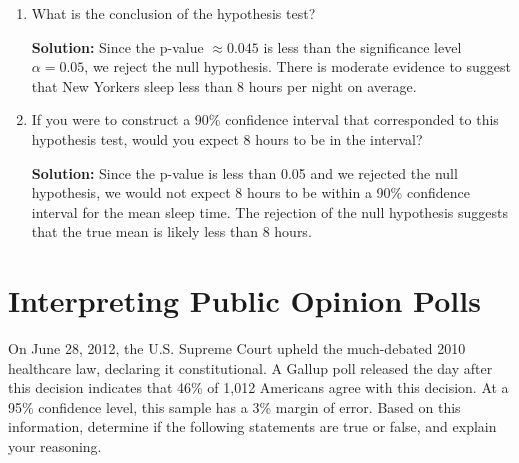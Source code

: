 \documentclass[12pt]{article}
\begin{document}
\begin{enumerate}
\item What is the conclusion of the hypothesis test?

\textbf{Solution:}
Since the p-value \( \approx 0.045 \) is less than the significance level \( \alpha = 0.05 \), we reject the null hypothesis. There is moderate evidence to suggest that New Yorkers sleep less than 8 hours per night on average.

\item  If you were to construct a 90\% confidence interval that corresponded to this hypothesis test, would you expect 8 hours to be in the interval?

\textbf{Solution:}
Since the p-value is less than 0.05 and we rejected the null hypothesis, we would not expect 8 hours to be within a 90\% confidence interval for the mean sleep time. The rejection of the null hypothesis suggests that the true mean is likely less than 8 hours.

\end{enumerate}







\section{Interpreting Public Opinion Polls}

On June 28, 2012, the U.S. Supreme Court upheld the much-debated 2010 healthcare law, declaring it constitutional. A Gallup poll released the day after this decision indicates that 46\% of 1,012 Americans agree with this decision. At a 95\% confidence level, this sample has a 3\% margin of error. Based on this information, determine if the following statements are true or false, and explain your reasoning.
\end{document}
